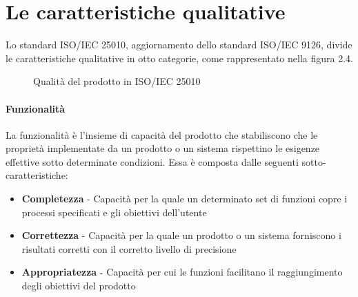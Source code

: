 \section{Le caratteristiche qualitative}
Lo standard ISO/IEC 25010\cite{iso25010}, aggiornamento dello standard ISO/IEC 9126\cite{iso9126}, divide le caratteristiche qualitative in otto categorie, come rappresentato nella figura 2.4.

\begin{figure}[H]
\centering
{}
\caption{Qualità del prodotto in ISO/IEC 25010\cite{iso25010}}\label{fig:4}
\end{figure}

\paragraph{Funzionalità}
La funzionalità è l'insieme di capacità del prodotto che stabiliscono che le proprietà implementate da un prodotto o un sistema  rispettino le esigenze effettive sotto determinate condizioni. Essa è composta dalle seguenti sotto-caratteristiche:
\begin{itemize}
\item \textbf{Completezza} - Capacità per la quale un determinato set di funzioni copre i processi specificati e gli obiettivi dell'utente
\item \textbf{Correttezza} - Capacità per la quale un prodotto o un sistema forniscono i risultati corretti con il corretto livello di precisione
\item \textbf{Appropriatezza} - Capacità per cui le funzioni facilitano il raggiungimento degli obiettivi del prodotto
\end{itemize}
